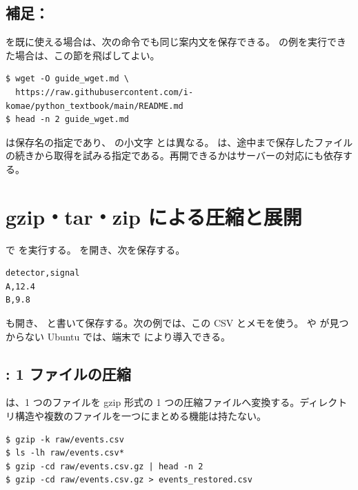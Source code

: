\subsection{補足：}

 を既に使える場合は、次の命令でも同じ案内文を保存できる。 の例を実行できた場合は、この節を飛ばしてよい。

\begin{lstlisting}[numbers=none, xleftmargin=2\zw]
$ wget -O guide_wget.md \
  https://raw.githubusercontent.com/i-komae/python_textbook/main/README.md
$ head -n 2 guide_wget.md
\end{lstlisting}

 は保存名の指定であり、 の小文字  とは異なる。 は、途中まで保存したファイルの続きから取得を試みる指定である。再開できるかはサーバーの対応にも依存する。

\section{gzip・tar・zip による圧縮と展開}

 で  を実行する。 を開き、次を保存する。

\begin{lstlisting}[numbers=none, title={raw/events.csv}]
detector,signal
A,12.4
B,9.8
\end{lstlisting}

 も開き、 と書いて保存する。次の例では、この CSV とメモを使う。 や  が見つからない Ubuntu では、端末で  により導入できる。

\subsection{: 1 ファイルの圧縮}

 は、1 つのファイルを gzip 形式の 1 つの圧縮ファイルへ変換する。ディレクトリ構造や複数のファイルを一つにまとめる機能は持たない。

\begin{lstlisting}[numbers=none, xleftmargin=2\zw]
$ gzip -k raw/events.csv
$ ls -lh raw/events.csv*
$ gzip -cd raw/events.csv.gz | head -n 2
$ gzip -cd raw/events.csv.gz > events_restored.csv
\end{lstlisting}

